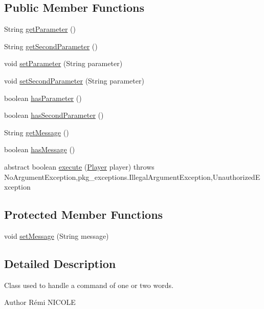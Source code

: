 \subsection*{Public Member Functions}
\begin{DoxyCompactItemize}
\item 
String \hyperlink{classpkg__commands_1_1Command_a41c92d445be73ea9d62320c65efb8434}{get\-Parameter} ()
\item 
String \hyperlink{classpkg__commands_1_1Command_a20d3ebdc0683a87b43be2a92a1cad111}{get\-Second\-Parameter} ()
\item 
void \hyperlink{classpkg__commands_1_1Command_a18446243a5fd360e9341b4b141c0cccc}{set\-Parameter} (String parameter)
\item 
void \hyperlink{classpkg__commands_1_1Command_af6de3828c27cd491ad24c4a97d69e856}{set\-Second\-Parameter} (String parameter)
\item 
boolean \hyperlink{classpkg__commands_1_1Command_a02af95ab3f1898a66259ab7c177b6998}{has\-Parameter} ()
\item 
boolean \hyperlink{classpkg__commands_1_1Command_add688a76d80576c34f23927da19b9e2d}{has\-Second\-Parameter} ()
\item 
String \hyperlink{classpkg__commands_1_1Command_ac2a42e2bab264821892daefaf9a18b6c}{get\-Message} ()
\item 
boolean \hyperlink{classpkg__commands_1_1Command_ae46bb048d0fa705a5037a5204b530da2}{has\-Message} ()
\item 
abstract boolean \hyperlink{classpkg__commands_1_1Command_a19008923c75a87c87d1f3ba8bf8be43f}{execute} (\hyperlink{classpkg__world_1_1Player}{Player} player)  throws No\-Argument\-Exception,pkg\-\_\-exceptions.\-Illegal\-Argument\-Exception,\-Unauthorized\-Exception
\end{DoxyCompactItemize}
\subsection*{Protected Member Functions}
\begin{DoxyCompactItemize}
\item 
void \hyperlink{classpkg__commands_1_1Command_ae210ff216fe908b111ba1c988a963d13}{set\-Message} (String message)
\end{DoxyCompactItemize}


\subsection{Detailed Description}
Class used to handle a command of one or two words. \begin{DoxyAuthor}{Author}
Rémi N\-I\-C\-O\-L\-E 
\end{DoxyAuthor}


